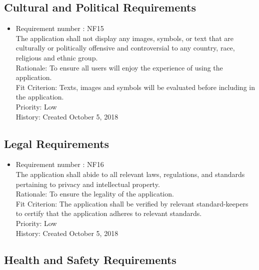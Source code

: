 \documentclass[12pt, titlepage]{article}
\begin{document}
\subsection{Cultural and Political Requirements}
\begin{itemize}
\item Requirement number : NF15\\
The application shall not display any images, symbols, or text that are culturally or politically offensive and controversial to any country, race, religious and ethnic group. \\
Rationale: To ensure all users will enjoy the experience of using the application. \\
Fit Criterion: Texts, images and symbols will be evaluated before including in  the application.   \\
Priority: Low\\
History: Created October 5, 2018

\end{itemize}
\subsection{Legal Requirements}
\begin{itemize}
\item Requirement number : NF16\\
The application shall abide to all relevant laws, regulations, and standards  pertaining to privacy and intellectual property.\\
Rationale: To ensure the legality of the application.\\
Fit Criterion:  The application shall be verified by relevant standard-keepers to certify that the application adheres to relevant standards.  \\
Priority: Low\\
History: Created October 5, 2018

\end{itemize}

\subsection{Health and Safety Requirements}
\end{document}
